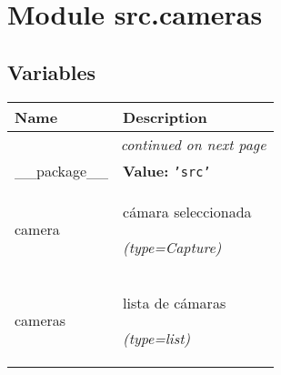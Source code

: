 %
%
%


\section{Module src.cameras}

    \label{src:cameras}


  \subsection{Variables}

    \vspace{-1cm}
\hspace{\varindent}\begin{longtable}{|p{\varnamewidth}|p{\vardescrwidth}|l}
\cline{1-2}
\cline{1-2} \centering \textbf{Name} & \centering \textbf{Description}& \\
\cline{1-2}
\endhead\cline{1-2}\multicolumn{3}{r}{\small\textit{continued on next page}}\\\endfoot\cline{1-2}
\endlastfoot\raggedright \_\-\_\-p\-a\-c\-k\-a\-g\-e\-\_\-\_\- & \raggedright \textbf{Value:} 
{\tt \texttt{'}\texttt{src}\texttt{'}}&\\
\cline{1-2}
\raggedright c\-a\-m\-e\-r\-a\- & \raggedright cámara seleccionada

            {\it (type=Capture)}&\\
\cline{1-2}
\raggedright c\-a\-m\-e\-r\-a\-s\- & \raggedright lista de cámaras

            {\it (type=list)}&\\
\cline{1-2}
\end{longtable}



